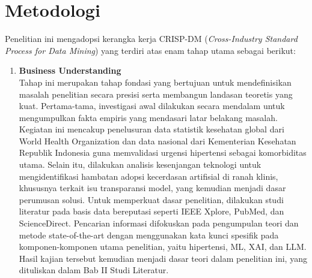 \section{Metodologi}
Penelitian ini mengadopsi kerangka kerja CRISP-DM (\textit{Cross-Industry Standard Process for Data Mining}) yang terdiri atas enam tahap utama sebagai berikut:
\begin{enumerate}
\item \textbf{Business Understanding}\\
Tahap ini merupakan tahap fondasi yang bertujuan untuk mendefinisikan masalah penelitian secara presisi serta membangun landasan teoretis yang kuat. Pertama-tama, investigasi awal dilakukan secara mendalam untuk mengumpulkan fakta empiris yang mendasari latar belakang masalah. Kegiatan ini mencakup penelusuran data statistik kesehatan global dari World Health Organization dan data nasional dari Kementerian Kesehatan Republik Indonesia guna memvalidasi urgensi hipertensi sebagai komorbiditas utama. Selain itu, dilakukan analisis kesenjangan teknologi untuk mengidentifikasi hambatan adopsi kecerdasan artifisial di ranah klinis, khususnya terkait isu transparansi model, yang kemudian menjadi dasar perumusan solusi. Untuk memperkuat dasar penelitian, dilakukan studi literatur pada basis data bereputasi seperti IEEE Xplore, PubMed, dan ScienceDirect. Pencarian informasi difokuskan pada pengumpulan teori dan metode state-of-the-art dengan menggunakan kata kunci spesifik pada komponen-komponen utama penelitian, yaitu hipertensi, ML, XAI, dan LLM. Hasil kajian tersebut kemudian menjadi dasar teori dalam penelitian ini, yang dituliskan dalam Bab II Studi Literatur.


\end{enumerate}
